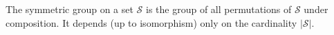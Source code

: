 The symmetric group on a set $\mathcal{S}$ is the group of all permutations of $\mathcal{S}$ under composition. It depends (up to isomorphism) only on the cardinality $|\mathcal{S}|$.
